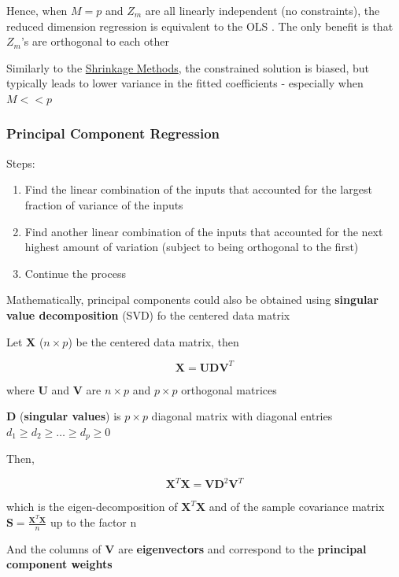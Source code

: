 \documentclass[
]{book}
\providecommand{\tightlist}{%
  \setlength{\itemsep}{0pt}\setlength{\parskip}{0pt}}
\begin{document}
Hence, when \(M = p\) and \(Z_m\) are all linearly independent (no constraints), the reduced dimension regression is equivalent to the OLS . The only benefit is that \(Z_m\)'s are orthogonal to each other

Similarly to the \protect\hyperlink{shrinkage-methods}{Shrinkage Methods}, the constrained solution is biased, but typically leads to lower variance in the fitted coefficients - especially when \(M << p\)

\hypertarget{principal-component-regression}{%
\subsubsection{Principal Component Regression}\label{principal-component-regression}}

Steps:

\begin{enumerate}
\def\labelenumi{\arabic{enumi}.}
\tightlist
\item
  Find the linear combination of the inputs that accounted for the largest fraction of variance of the inputs
\item
  Find another linear combination of the inputs that accounted for the next highest amount of variation (subject to being orthogonal to the first)
\item
  Continue the process
\end{enumerate}

Mathematically, principal components could also be obtained using \textbf{singular value decomposition} (SVD) fo the centered data matrix

Let \(\mathbf{X}\) (\(n \times p\)) be the centered data matrix, then

\[
\mathbf{X} = \mathbf{UDV}^T
\]

where \(\mathbf{U}\) and \(\mathbf{V}\) are \(n \times p\) and \(p \times p\) orthogonal matrices

\(\mathbf{D}\) (\textbf{singular values}) is \(p \times p\) diagonal matrix with diagonal entries \(d_1 \ge d_2 \ge \dots \ge d_p \ge 0\)

Then,

\[
\mathbf{X}^T \mathbf{X} = \mathbf{VD}^2 \mathbf{V}^T
\]

which is the eigen-decomposition of \(\mathbf{X}^T \mathbf{X}\) and of the sample covariance matrix \(\mathbf{S} = \frac{\mathbf{X}^T \mathbf{X}}{n}\) up to the factor n

And the columns of \(\mathbf{V}\) are \textbf{eigenvectors} and correspond to the \textbf{principal component weights}
\end{document}

